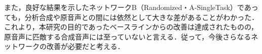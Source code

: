 また，良好な結果を示したネットワークB（Randomized・A-SingleTask）であっても，分析合成や原音声との間には依然として大きな差があることがわかった．これより，本研究の目的であったベースラインからの改善は達成されたものの，原音声に匹敵する合成音声には至っていないと言える．従って，今後さらなるネットワークの改善が必要だと考える．

\begin{table}[bt]
    \centering
    \caption{主観評価実験の結果より計算した標本平均と95\%信頼区間}
    \label{sec4:tab:sbj_mean_ci}
    \begin{center}
        \renewcommand{\arraystretch}{1.0} %
        \setlength{\tabcolsep}{8pt}      %
    \end{center}
\end{table}

